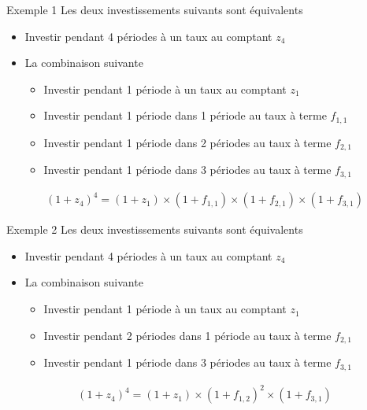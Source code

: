 \documentclass[11pt]{beamer}
\begin{document}
\begin{frame}{Exemple 1}
Les deux investissements suivants sont équivalents
\begin{itemize}
\item Investir pendant 4 périodes à un taux au comptant $z_4$
\item La combinaison suivante
\begin{itemize}
\item Investir pendant 1 période à un taux au comptant $z_1$
\item Investir pendant 1 période dans 1 période au taux à terme $f_{1,1}$
\item Investir pendant 1 période dans 2 périodes au taux à terme $f_{2,1}$
\item Investir pendant 1 période dans 3 périodes au taux à terme $f_{3,1}$
\end{itemize}
\end{itemize}
\begin{align*}
(1+z_4)^4=(1+z_1) \times (1+f_{1,1}) \times (1+f_{2,1}) \times (1+f_{3,1})
\end{align*}
\end{frame}

\begin{frame}{Exemple 2}
Les deux investissements suivants sont équivalents
\begin{itemize}
\item Investir pendant 4 périodes à un taux au comptant $z_4$
\item La combinaison suivante
\begin{itemize}
\item Investir pendant 1 période à un taux au comptant $z_1$
\item Investir pendant 2 périodes dans 1 période au taux à terme $f_{2,1}$
\item Investir pendant 1 période dans 3 périodes au taux à terme $f_{3,1}$
\end{itemize}
\end{itemize}
\begin{align*}
(1+z_4)^4=(1+z_1) \times (1+f_{1,2})^2 \times (1+f_{3,1})
\end{align*}
\end{frame}
\end{document}
